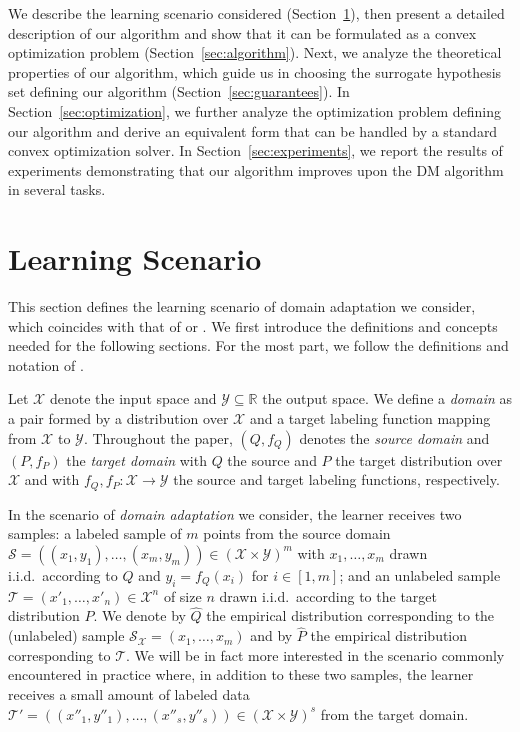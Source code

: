 \documentclass[twoside,11pt]{article}
\def\Rset{\mathbb{R}}
\newcommand{\h}{\widehat}
\newcommand{\cS}{{\mathcal S}}
\newcommand{\cT}{{\mathcal T}}
\newcommand{\cX}{{\mathcal X}}
\newcommand{\cY}{{\mathcal Y}}
\newcommand{\1}{\mat{1}}
\begin{document}
We describe the learning scenario considered
(Section~\ref{sec:scenario}), then present a detailed description of
our algorithm and show that it can be formulated as a convex
optimization problem (Section~\ref{sec:algorithm}). Next, we analyze
the theoretical properties of our algorithm, which guide us in
choosing the surrogate hypothesis set defining our algorithm
(Section~\ref{sec:guarantees}). In Section~\ref{sec:optimization}, we
further analyze the optimization problem defining our algorithm and
derive an equivalent form that can be handled by a standard convex
optimization solver.  In Section~\ref{sec:experiments}, we report the
results of experiments demonstrating that our algorithm improves upon
the DM algorithm in several tasks.

\section{Learning Scenario}
\label{sec:scenario}

This section defines the learning scenario of domain adaptation we
consider, which coincides with that of
\cite{BenDavidBlitzerCrammerPereira2006} or
\cite{MansourMohriRostamizadeh2009,CortesMohri2013}. We
first introduce the definitions and concepts needed for the following
sections. For the most part, we follow the definitions and notation of
\citet{CortesMohri2013}.

Let $\cX$ denote the input space and $\cY \subseteq \Rset$ the output
space. We define a \emph{domain} as a pair formed by a distribution
over $\cX$ and a target labeling function mapping from $\cX$ to
$\cY$. Throughout the paper, $(Q, f_Q)$ denotes the \emph{source
domain} and $(P, f_P)$ the \emph{target domain} with $Q$ the source
and $P$ the target distribution over $\cX$ and with
$f_Q, f_P \colon \cX \to \cY$ the source and target labeling
functions, respectively.

In the scenario of \emph{domain adaptation} we consider, the learner
receives two samples: a labeled sample of $m$ points from the source
domain $\cS = ((x_1,y_1), \ldots, (x_m, y_m)) \in (\cX \times \cY)^m$
with $x_1, \ldots, x_m$ drawn i.i.d.\ according to $Q$ and
$y_i = f_Q(x_i)$ for $i \in [1, m]$; and an unlabeled sample
$\cT = (x'_1, \ldots, x'_n)\in \cX^n$ of size $n$ drawn i.i.d.\
according to the target distribution $P$. We denote by $\h Q$ the
empirical distribution corresponding to the (unlabeled) sample
$\cS_\cX = (x_1, \ldots, x_m)$ and by $\h P$ the empirical
distribution corresponding to $\cT$. We will be in fact more
interested in the scenario commonly encountered in practice where, in
addition to these two samples, the learner receives a small amount of
labeled data
$\cT' = ((x''_1, y''_1), \ldots, (x''_{s}, y''_{s})) \in (\cX \times \cY)^{s}$
from the target domain.
\end{document}
